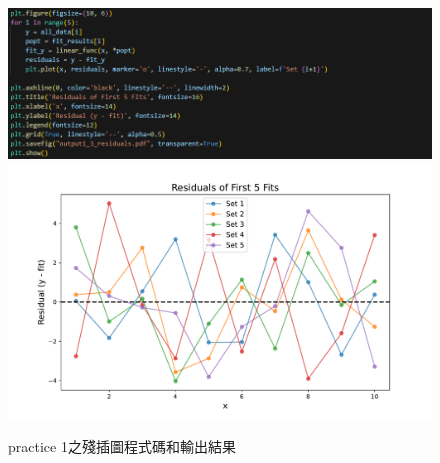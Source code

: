 \documentclass[12pt,a4paper]{article}
\begin{document}
\begin{CJK}{UTF8}{bkai}
\begin{itemize}
\begin{enumerate}
\begin{figure}[h]
            \includegraphics[width=1\linewidth]{figures/code/practice_1/practice 1QA.png}
            \includegraphics[width=1\linewidth]{figures/output/practice_1/output1_3_residuals.pdf}
            \caption{practice 1之殘插圖程式碼和輸出結果}
            \label{fig:residual}
        \end{figure}
    
        \clearpage
    

\end{enumerate}
\end{itemize}
\end{CJK}
\end{document}
